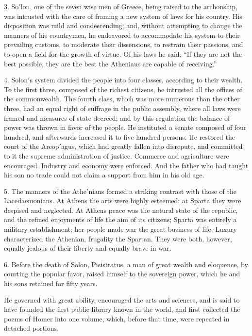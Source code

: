 \documentclass[openany,a4paper]{memoir}
\begin{document}
3. So$'$lon, one of the seven wise men of Greece, being 
raised to the archonship, was intrusted with the care of 
framing a new system of laws for his country. His disposition was mild and condescending; and, without attempting to change the manners of his countrymen, he endeavored 
to accommodate his system to their prevailing customs, to 
moderate their dissensions, to restrain their passions, and to 
open a field for the growth of virtue. Of his laws he said, 
``If they are not the best possible, they are the best the 
Atheniaus are capable of receiving.''

4. Solon$'$s system divided the people into four classes, 
according to their wealth. To the first three, composed of 
the richest citizens, he intrusted all the offices of the commonwealth. The fourth class, which was more numerous 
than the other three, had an equal right of suffrage in the 
public assembly, where all laws were framed and measures 
of state decreed; and by this regulation the balance of power 
was thrown in favor of the people. He instituted a senate 
composed of four hundred, and afterwards increased it to 
five hundred persons. He restored the court of the Areop$'$agus, which had greatly fallen into disrepute, and committed to it the supreme administration of justice. Commerce and agriculture were encouraged. Industry and 
economy were enforced. And the father who had taught 
his son no trade could not claim a support from him in his 
old age. 

5. The manners of the Athe$'$nians formed a striking contrast with those of the Lacedaemonians. At Athens the 
arts were highly esteemed; at Sparta they were despised 
and neglected. At Athens peace was the natural state of 
the republic, and the refined enjoyments of life the aim of 
its citizens; Sparta was entirely a military establishment; 
her people made war the great business of life. Luxury 
characterized the Athenian, frugality the Spartan. They 
were both, however, equally jealous of their liberty and 
equally brave in war. 


6. Before the death of Solon, Pisistratus, a man of great 
wealth and eloquence, by courting the popular favor, raised 
himself to the sovereign power, which he and his sons retained for fifty years. 

He governed with great ability, encouraged the arts and 
sciences, and is said to have founded the first public library 
known in the world, and first collected the poems of Homer 
into one volume, which, before that time, were repeated in 
detached portions. 
\end{document}
